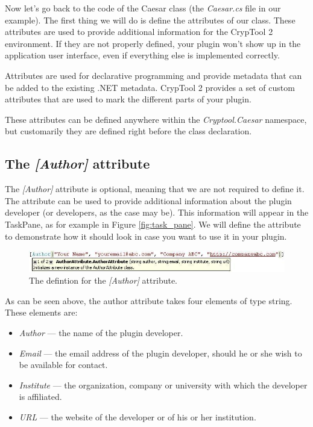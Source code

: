Now let's go back to the code of the Caesar class (the \textit{Caesar.cs} file in our example). The first thing we will do is define the attributes of our class. These attributes are used to provide additional information for the CrypTool 2 environment. If they are not properly defined, your plugin won't show up in the application user interface, even if everything else is implemented correctly.

Attributes are used for declarative programming and provide metadata that can be added to the existing .NET metadata. CrypTool 2 provides a set of custom attributes that are used to mark the different parts of your plugin.

These attributes can be defined anywhere within the \textit{Cryptool.Caesar} namespace, but customarily they are defined right before the class declaration.

\subsection{The \protect\textit{[Author]} attribute}
\label{sec:TheAuthorAttribute}

The \textit{[Author]} attribute is optional, meaning that we are not required to define it. The attribute can be used to provide additional information about the plugin developer (or developers, as the case may be). This information will appear in the TaskPane, as for example in Figure \ref{fig:task_pane}. We will define the attribute to demonstrate how it should look in case you want to use it in your plugin.

\begin{figure}[h!]
	\centering
		\includegraphics[width=.90\textwidth]{figures/attribute_author.jpg}
	\caption{The defintion for the \textit{[Author]} attribute.}
	\label{fig:attribute_author}
\end{figure}

As can be seen above, the author attribute takes four elements of type string. These elements are:

\begin{itemize}
	\item \textit{Author} --- the name of the plugin developer.
	\item \textit{Email} --- the email address of the plugin developer, should he or she wish to be available for contact.
	\item \textit{Institute} --- the organization, company or university with which the developer is affiliated.
	\item \textit{URL} --- the website of the developer or of his or her institution.
\end{itemize}

